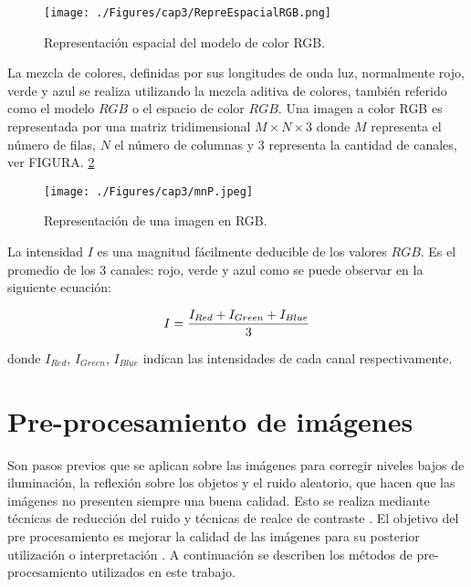  \begin{figure}[H]
	\centering
		\texttt{[image: ./Figures/cap3/RepreEspacialRGB.png]}
	\caption{Representación espacial del modelo de color RGB.}
	\label{fig:refEspRGB}
\end{figure}

La mezcla de colores, definidas por sus longitudes de onda luz, normalmente rojo, verde y azul se realiza utilizando la mezcla aditiva de colores,
también referido como el modelo $RGB$ o el espacio de color $RGB$.
%
%
Una imagen a color RGB es representada por una matriz tridimensional $M \times N \times 3$ donde $M$ representa el número de filas, $N$ el número de columnas y 3 representa la cantidad de canales, ver FIGURA. \ref{fig:mezclaAditiva} %
 \begin{figure}[H]
	\centering

		\texttt{[image: ./Figures/cap3/mnP.jpeg]}
	\caption{Representación de una imagen en RGB.}

	\label{fig:mezclaAditiva}
\end{figure}
%

La intensidad $I$ es una magnitud fácilmente deducible de los valores $RGB$. Es el promedio de los 3 canales: rojo, verde y azul como se puede observar en la siguiente ecuación:

\begin{equation}
\centering
\label{eq:intensidad}
I=\frac{I_{Red}+I_{Green}+I_{Blue}}{3}
\end{equation}

%
%
%
donde $I_{Red}$, $I_{Green}$, $I_{Blue}$ indican las intensidades de cada canal respectivamente.
\section{Pre-procesamiento de imágenes}

Son pasos previos que se aplican sobre las imágenes para corregir niveles bajos de iluminación, la reflexión sobre los objetos y el ruido aleatorio, que hacen que las imágenes no presenten siempre una buena calidad. Esto se realiza mediante técnicas de reducción del ruido y técnicas de realce de contraste \cite{alvarez2006preprocesamiento}.
El objetivo del pre procesamiento es mejorar la calidad de las imágenes para su posterior utilización  o interpretación  \cite{de2001vision}. A continuación se describen  los métodos de pre-procesamiento utilizados en este trabajo.

